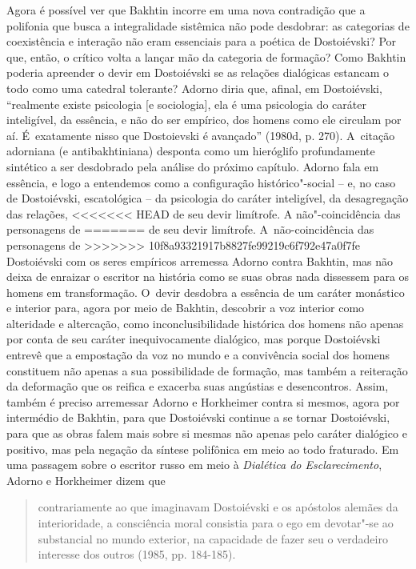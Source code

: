 {{Agora é possível ver que Bakhtin incorre em uma nova contradição que a
polifonia que busca a integralidade sistêmica não pode desdobrar: as
categorias de coexistência e interação não eram essenciais para a
poética de Dostoiévski? Por que, então, o crítico volta a lançar mão da
categoria de formação? Como Bakhtin poderia apreender o devir em
Dostoiévski se as relações dialógicas estancam o todo como uma catedral
tolerante? Adorno diria que, afinal, em Dostoiévski, ``realmente existe
psicologia {[}e sociologia{]}, ela é uma psicologia do caráter
inteligível, da essência, e não do ser empírico, dos homens como ele
circulam por aí. É~exatamente nisso que Dostoievski é avançado'' (1980d,
p. 270). A~citação adorniana (e antibakhtiniana) desponta como um
hieróglifo profundamente sintético a ser desdobrado pela análise do
próximo capítulo. Adorno fala em essência, e logo a entendemos como a
configuração histórico"-social -- e, no caso de Dostoiévski, escatológica
-- da psicologia do caráter inteligível, da desagregação das relações,
<<<<<<< HEAD
de seu devir limítrofe. A não"-coincidência das personagens de
=======
de seu devir limítrofe. A~não-coincidência das personagens de
>>>>>>> 10f8a93321917b8827fe99219c6f792e47a0f7fe
Dostoiévski com os seres empíricos arremessa Adorno contra Bakhtin, mas
não deixa de enraizar o escritor na história como se suas obras nada
dissessem para os homens em transformação. O~devir desdobra a essência
de um caráter monástico e interior para, agora por meio de Bakhtin,
descobrir a voz interior como alteridade e altercação, como
inconclusibilidade histórica dos homens não apenas por conta de seu
caráter inequivocamente dialógico, mas porque Dostoiévski entrevê que a
empostação da voz no mundo e a convivência social dos homens constituem
não apenas a sua possibilidade de formação, mas também a reiteração da
deformação que os reifica e exacerba suas angústias e desencontros.
Assim, também é preciso arremessar Adorno e Horkheimer contra si mesmos,
agora por intermédio de Bakhtin, para que Dostoiévski continue a se
tornar Dostoiévski, para que as obras falem mais sobre si mesmas não
apenas pelo caráter dialógico e positivo, mas pela negação da síntese
polifônica em meio ao todo fraturado. Em uma passagem sobre o escritor
russo em meio à \emph{Dialética do Esclarecimento}, Adorno e Horkheimer
dizem que

\begin{quote}
contrariamente ao que imaginavam Dostoiévski e os apóstolos alemães da
interioridade, a consciência moral consistia para o ego em devotar"-se ao
substancial no mundo exterior, na capacidade de fazer seu o verdadeiro
interesse dos outros (1985, pp. 184-185).
\end{quote}

}}
